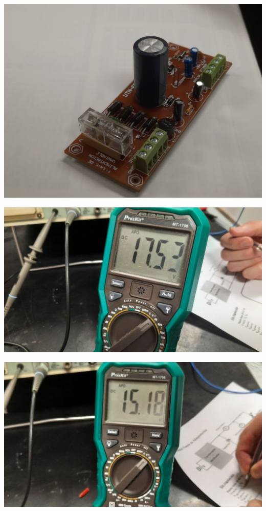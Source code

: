 \begin{center}
    \centering
    \includegraphics[width=0.9\linewidth]{./imagenes/placa_completa.jpg}
\end{center}


\begin{center}
    \centering
    \includegraphics[width=0.9\linewidth]{./imagenes/tension_baja_vacio.jpg}
\end{center}


\begin{center}
    \centering
    \includegraphics[width=0.9\linewidth]{./imagenes/tension_baja_050.jpg}
\end{center}

